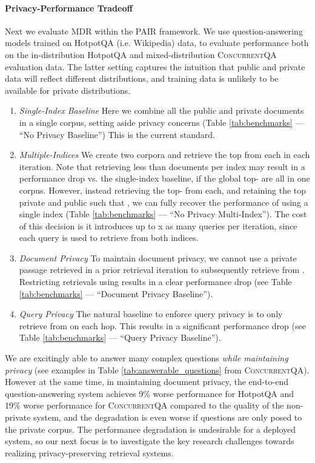 \documentclass{article}
\newcommand{\datasetname}{\textsc{ConcurrentQA}\xspace}
\newcommand{\problemshortname}{\textsc{PAIR}\xspace}
\begin{document}
\paragraph{Privacy-Performance Tradeoff} Next we evaluate MDR within the \problemshortname framework. We use question-answering models trained on HotpotQA (i.e. Wikipedia) data, to evaluate performance both on the in-distribution HotpotQA and mixed-distribution \datasetname evaluation data. The latter setting captures the intuition that public and private data will reflect different distributions, and training data is unlikely to be available for private distributions.

\begin{enumerate}
\item \textit{Single-Index Baseline} Here we combine all the public and private documents in a single corpus, setting aside privacy concerns (Table \ref{tab:benchmarks} --- ``No Privacy Baseline'') This is the current standard.
\item \textit{Multiple-Indices} We create two corpora and retrieve the top  from each in each iteration. Note that retrieving less than  documents per index may result in a performance drop vs. the single-index baseline, if the global top- are all in one corpus. However, instead retrieving the top- from each, and retaining the top  private and  public such that , we can fully recover the performance of using a single index (Table \ref{tab:benchmarks} --- ``No Privacy Multi-Index'').  The cost of this decision is it introduces up to x as many queries per iteration, since each query is used to retrieve from both indices.
\item \textit{Document Privacy} To maintain document privacy, we cannot use a private passage  retrieved in a prior retrieval iteration to subsequently retrieve from . 
Restricting retrievals using  results in a clear performance drop (see Table \ref{tab:benchmarks} --- ``Document Privacy Baseline''). 

\item \textit{Query Privacy} The natural baseline to enforce query privacy is to only retrieve from  on each hop. This results in a significant performance drop (see Table \ref{tab:benchmarks} --- ``Query Privacy Baseline'').
\end{enumerate}

We are excitingly able to answer many complex questions \textit{while maintaining privacy} (see examples in Table \ref{tab:answerable_questions} from \datasetname). However at the same time, in maintaining document privacy, the end-to-end question-answering system achieves 9\% worse performance for HotpotQA and 19\% worse performance for \datasetname compared to the quality of the non-private system, and the degradation is even worse if questions are only posed to the private corpus. The performance degradation is undesirable for a deployed system, so our next focus is to investigate the key research challenges towards realizing privacy-preserving retrieval systems. 
\end{document}
